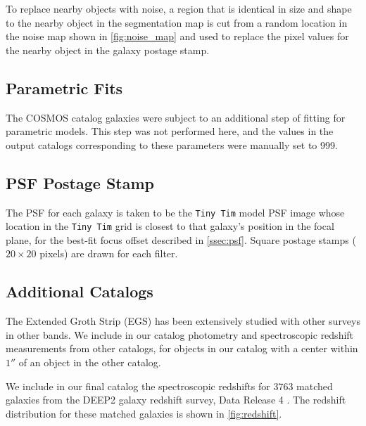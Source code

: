 \documentclass[a4paper,11pt]{article}
\begin{document}
To replace nearby objects with noise, a region that is identical in size and shape to the nearby object in the segmentation map is cut from a random location in the noise map shown in \autoref{fig:noise_map} and used to replace the pixel values for the nearby object in the galaxy postage stamp.  

\subsection{Parametric Fits}
The COSMOS catalog galaxies were subject to an additional step of fitting for parametric models. This step was not performed here, and the values in the output catalogs corresponding to these parameters were manually set to 999.

\subsection{PSF Postage Stamp}
The PSF for each galaxy is taken to be the {\tt Tiny Tim} model PSF image whose location in the {\tt Tiny Tim} grid is closest to that galaxy's position in the focal plane, for the best-fit focus offset described in \autoref{ssec:psf}. Square postage stamps ($20 \times 20$ pixels) are drawn for each filter.

\subsection{Additional Catalogs}
The Extended Groth Strip (EGS) has been extensively studied with other surveys in other bands. 
We include in our catalog photometry and spectroscopic redshift measurements from other catalogs, for objects in our catalog with a center within $1''$ of an object in the other catalog.

We include in our final catalog the spectroscopic redshifts for 3763 matched galaxies from the DEEP2 galaxy redshift survey, Data Release 4 \citep{Newman2013}. 
The redshift distribution for these matched galaxies is shown in \autoref{fig:redshift}. 
\end{document}
